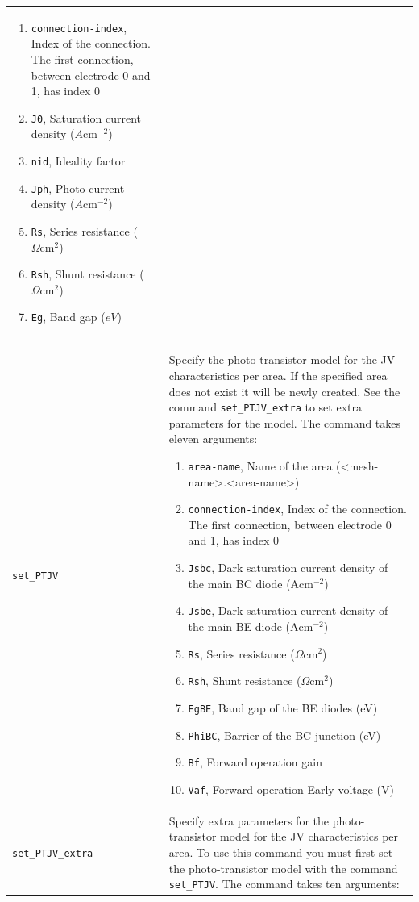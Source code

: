 \documentclass[noshowpacs,preprintnumbers,amsmath,amssymb, letter]{revtex4}
\begin{document}
\begin{longtable}{p{}p{}}
\begin{enumerate}
\item \texttt{connection-index}, Index of the connection. The first connection, between electrode 0 and 1,  has index 0
\item \texttt{J0}, Saturation current density ($A \text{cm}^{-2}$)
\item \texttt{nid}, Ideality factor
\item \texttt{Jph}, Photo current density ($A \text{cm}^{-2}$)
\item \texttt{Rs}, Series resistance ($\Omega \text{cm}^2$)
\item \texttt{Rsh}, Shunt resistance ($\Omega \text{cm}^2$)
\item \texttt{Eg}, Band gap ($eV$)
\end{enumerate}\\
\texttt{set\_PTJV}	&  Specify the photo-transistor model for the JV characteristics per area. If the specified area does not exist it will be newly created. See the command \texttt{set\_PTJV\_extra} to set extra parameters for the model. The command takes eleven arguments:
\begin{enumerate}
\item \texttt{area-name}, Name of the area (\textless mesh-name\textgreater .\textless area-name\textgreater )
\item \texttt{connection-index}, Index of the connection. The first connection, between electrode 0 and 1,  has index 0
\item \texttt{Jsbc},  Dark saturation current density of the main BC diode ($\text{A}\text{cm}^{-2}$)
\item \texttt{Jsbe},  Dark saturation current density of the main BE diode  ($\text{A}\text{cm}^{-2}$)
\item \texttt{Rs}, Series resistance ($\Omega \text{cm}^2$)
\item \texttt{Rsh}, Shunt resistance ($\Omega \text{cm}^2$)
\item \texttt{EgBE},  Band gap of the BE diodes (eV)
\item \texttt{PhiBC},  Barrier of the BC junction (eV)
\item \texttt{Bf},  Forward operation gain 
\item \texttt{Vaf},  Forward operation Early voltage (V)
\end{enumerate}\\
\texttt{set\_PTJV\_extra}	&  Specify extra parameters for the photo-transistor model for the JV characteristics per area. To use this command you must first set the photo-transistor model with the command \texttt{set\_PTJV}. The command takes ten arguments:

\end{longtable}
\end{document}
